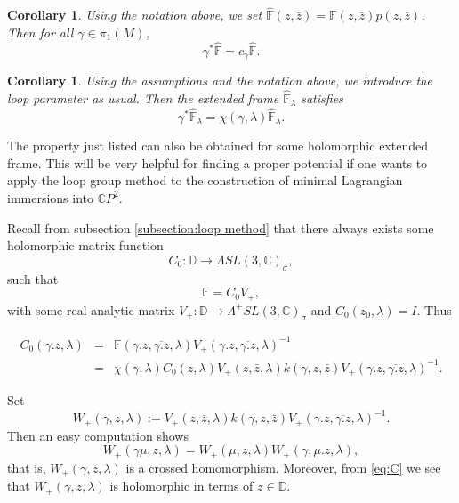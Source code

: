 \documentclass[a4paper,11pt]{amsart}
\newtheorem{corollary}[theorem]{Corollary}
\theoremstyle{definition}
\numberwithin{equation}{section}
\newcommand{\C}{\mathbb{C}}
\newcommand{\F}{\mathbb{F}}
\begin{document}
\begin{corollary}\label{cor5.3}
Using the notation above, we set $\hat{\mathbb{F}}(z, \bar{z}) = \mathbb{F}(z, \bar{z}) p(z, \bar{z})$.
Then  
for all $\gamma \in \pi_1(M)$,
\begin{equation}
\gamma^* \hat{\mathbb{F}} = c_\gamma \hat{\mathbb{F}}.
\end{equation}
\end{corollary}

\begin{corollary}
Using the assumptions and the notation above, we introduce the loop parameter as usual. Then the extended frame $\hat{\mathbb{F}}_\lambda$ satisfies
\begin{equation}
\gamma^* \hat{\mathbb{F}}_\lambda = \chi(\gamma, \lambda)\hat{\mathbb{F}}_\lambda.
\end{equation}
\end{corollary}

The property just listed can also be obtained for some holomorphic extended frame.
This will be very helpful for finding a proper potential if one wants to apply the
loop group  method to the construction of minimal Lagrangian
immersions into $\C P^2$.

Recall from subsection \ref{subsection:loop method} that there always exists some holomorphic matrix function 
\begin{equation*}
C_0: \mathbb{D}\rightarrow \Lambda SL(3,\mathbb{C})_{\sigma},
\end{equation*}
such that 
\begin{equation*}
\F=C_0V_+,
\end{equation*}
with some real analytic matrix $V_+: \mathbb{D}\rightarrow \Lambda^{+} SL(3,\mathbb{C})_{\sigma}$ 
and $C_0(z_0,\lambda)=I$.
Thus 

\begin{eqnarray}
C_0(\gamma . z,\lambda)&=&\F(\gamma . z, \overline{\gamma . z}, \lambda) 
V_+(\gamma. z, \overline{\gamma . z}, \lambda)^{-1}\nonumber \\
&=&\chi(\gamma, \lambda) C_0(z,\lambda) V_+(z, \bar{z},\lambda) k(\gamma, z, \bar{z})
V_{+}(\gamma . z, \overline{\gamma . z}, \lambda)^{-1}. \label{eq:C}
\end{eqnarray}

Set 
\begin{equation*}
W_+(\gamma, z, \lambda):=V_+(z, \bar{z},\lambda) k(\gamma, z, \bar{z}) 
V_+(\gamma . z, \overline{ \gamma . z}, \lambda)^{-1}.
\end{equation*}
Then an easy computation shows
\begin{equation*}
W_+(\gamma \mu, z, \lambda)=W_+(\mu, z,\lambda) W_+(\gamma, \mu. z, \lambda),
\end{equation*}
that is, $W_+(\gamma, z, \lambda)$ is  a crossed homomorphism.
Moreover, from \eqref{eq:C} we see that $W_+(\gamma, z, \lambda)$ is holomorphic in terms of 
$z \in \mathbb{D}$.
\end{document}
